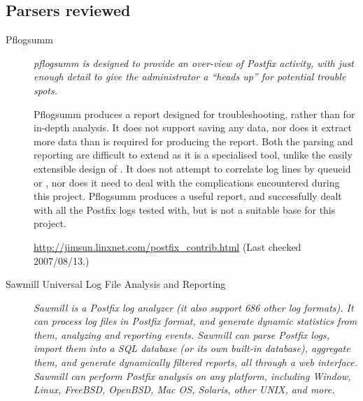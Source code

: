 \documentclass[a4paper,12pt,draft]{article}
\newcommand{\parsername}{\PLP{}}
\begin{document}
\subsection{Parsers reviewed}

\begin{description}

    \item [Pflogsumm] \textit{pflogsumm is designed to provide an over-view
        of Postfix activity, with just enough detail to give the
        administrator a ``heads up'' for potential trouble spots.\/}

        Pflogsumm produces a report designed for troubleshooting, rather
        than for in-depth analysis.  It does not support saving any data,
        nor does it extract more data than is required for producing the
        report.  Both the parsing and reporting are difficult to extend as
        it is a specialised tool, unlike the easily extensible design of
        \parsername{}.  It does not attempt to correlate log lines by
        queueid or \pid{}, nor does it need to deal with the complications
        encountered during this project.  Pflogsumm produces a useful
        report, and successfully dealt with all the Postfix logs tested
        with, but is not a suitable base for this project.

        \url{http://jimsun.linxnet.com/postfix_contrib.html} \newline (Last
        checked 2007/08/13.)

    \item [Sawmill Universal Log File Analysis and Reporting] \textit{
        Sawmill is a \newline Postfix log analyzer (it also support 686
        other log formats).  It can process log files in Postfix format,
        and generate dynamic statistics from them, analyzing and reporting
        events.  Sawmill can parse Postfix logs, import them into a SQL
        database (or its own built-in database), aggregate them, and
        generate dynamically filtered reports, all through a web interface.
        Sawmill can perform Postfix analysis on any platform, including
        Window, Linux, FreeBSD, OpenBSD, Mac OS, Solaris, other UNIX, and
        more.\/}


\end{description}
\end{document}
